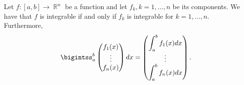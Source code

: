 \begin{proposition}\label{thm:componentwise_integration}
  Let \( f: [a, b] \to \BbbR^n \) be a function and let \( f_k, k = 1, \ldots, n \) be its components. We have that \( f \) is integrable if and only if \( f_k \) is integrable for \( k = 1, \ldots, n \). Furthermore,
  \begin{equation}\label{eq:thm:componentwise_integration}
    \bigintss_a^b \begin{pmatrix} f_1(x) \\ \vdots \\ f_n(x) \end{pmatrix} dx
    =
    \begin{pmatrix} {\displaystyle \int_a^b f_1(x)} dx \\ \vdots \\ {\displaystyle \int_a^b f_n(x) dx} \end{pmatrix}.
  \end{equation}
\end{proposition}

